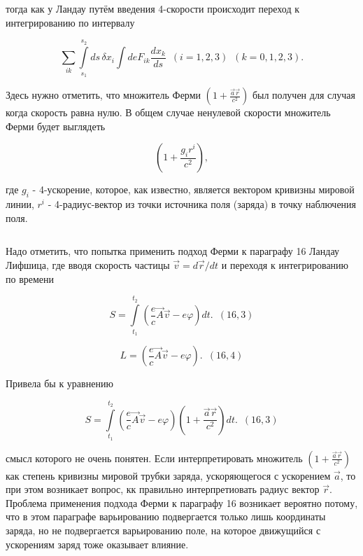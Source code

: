 \documentclass[11pt]{article}
\makeatletter
\newcommand{\boxspacing}{\kern\kvtcb@left@rule\kern\kvtcb@boxsep}
\newcommand{\prompt}[4]{
        {\ttfamily\llap{{\color{#2}[#3]:\hspace{3pt}#4}}\vspace{-\baselineskip}}
    }
\makeatother
\begin{document}
    тогда как у Ландау путём введения 4-скорости происходит переход к
интегрированию по интервалу

    \[\sum_{ik} \int\limits_{s_1}^{s_2} ds \, \delta x_i \int de F_{ik}  \frac{dx_{k}}{ds} \,\,\,(i = 1,2,3)\,\,\,(k = 0,1,2,3).\]

    Здесь нужно отметить, что множитель Ферми
\(\left( 1 + \frac{\vec a \vec r}{c^2}\right)\) был получен для случая
когда скорость равна нулю. В общем случае ненулевой скорости множитель
Ферми будет выглядеть

\[\left( 1 + \frac{g_i r^i}{c^2}\right),\]

где \(g_i\) - 4-ускорение, которое, как известно, является вектором
кривизны мировой линии, \(r^i\) - 4-радиус-вектор из точки источника
поля (заряда) в точку наблючения поля.

    \begin{tcolorbox}[breakable, size=fbox, boxrule=1pt, pad at break*=1mm,colback=cellbackground, colframe=cellborder]
\prompt{In}{incolor}{ }{\boxspacing}
\begin{Verbatim}[commandchars=\\\{\}]

\end{Verbatim}
\end{tcolorbox}

    Надо отметить, что попытка применить подход Ферми к параграфу 16 Ландау
Лифшица, где вводя скорость частицы \(\vec v = d \vec r /d t\) и
переходя к интегрированию по времени

    \[S = \int\limits_{t_1}^{t_2} \left(\frac{e}{c}\vec A \vec v - e \varphi \right) dt. \,\,\,  (16,3)\]

\[L = \left(\frac{e}{c}\vec A \vec v - e \varphi \right). \,\,\,  (16,4)\]

Привела бы к уравнению

\[S = \int\limits_{t_1}^{t_2} \left(\frac{e}{c}\vec A \vec v - e \varphi \right) \left(1+\frac{\vec a \vec r}{c^2}\right) dt. \,\,\,  (16,3)\]

смысл которого не очень понятен. Если интерпретировать множитель
\(\left(1+\frac{\vec a \vec r}{c^2}\right)\) как степень кривизны
мировой трубки заряда, ускоряющегося с ускорением \(\vec a\), то при
этом возникает вопрос, кк правильно интерпретиовать радиус вектор
\(\vec r\). Проблема применения подхода Ферми к параграфу 16 возникает
вероятно потому, что в этом параграфе варьированию подвергается только
лишь координаты заряда, но не подвергается варьированию поле, на которое
движущийся с ускорениям заряд тоже оказывает влияние.

    \begin{tcolorbox}[breakable, size=fbox, boxrule=1pt, pad at break*=1mm,colback=cellbackground, colframe=cellborder]
\prompt{In}{incolor}{ }{\boxspacing}
\begin{Verbatim}[commandchars=\\\{\}]

\end{Verbatim}
\end{tcolorbox}


\end{document}
